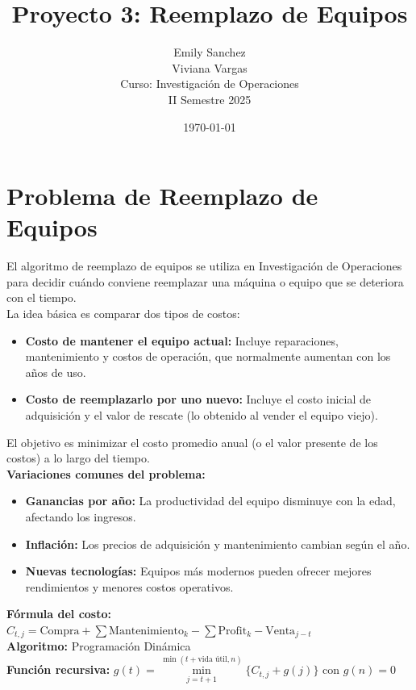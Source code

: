 \documentclass[12pt]{article}
\title{Proyecto 3: Reemplazo de Equipos}
\author{Emily Sanchez \\ Viviana Vargas \\[1cm] Curso: Investigación de Operaciones \\ II Semestre 2025}
\date{\today}
\begin{document}
\maketitle
\newpage
\section*{Problema de Reemplazo de Equipos}
El algoritmo de reemplazo de equipos se utiliza en Investigación de Operaciones para decidir cuándo conviene reemplazar una máquina o equipo que se deteriora con el tiempo.\\
La idea básica es comparar dos tipos de costos:\\
\begin{itemize}
\item \textbf{Costo de mantener el equipo actual:} Incluye reparaciones, mantenimiento y costos de operación, que normalmente aumentan con los años de uso.\\
\item \textbf{Costo de reemplazarlo por uno nuevo:} Incluye el costo inicial de adquisición y el valor de rescate (lo obtenido al vender el equipo viejo).\\
\end{itemize}
El objetivo es minimizar el costo promedio anual (o el valor presente de los costos) a lo largo del tiempo.\\
\textbf{Variaciones comunes del problema:}\\
\begin{itemize}
\item \textbf{Ganancias por año:} La productividad del equipo disminuye con la edad, afectando los ingresos.\\
\item \textbf{Inflación:} Los precios de adquisición y mantenimiento cambian según el año.\\
\item \textbf{Nuevas tecnologías:} Equipos más modernos pueden ofrecer mejores rendimientos y menores costos operativos.\\
\end{itemize}
\textbf{Fórmula del costo:} $C_{t,j} = \text{Compra} + \sum \text{Mantenimiento}_k - \sum \text{Profit}_k - \text{Venta}_{j-t}$\\
\textbf{Algoritmo:} Programación Dinámica \\
\textbf{Función recursiva:} $g(t) = \min\limits_{j=t+1}^{\min(t+\text{vida útil}, n)} \{C_{t,j} + g(j)\}$ con $g(n) = 0$\\
\end{document}
